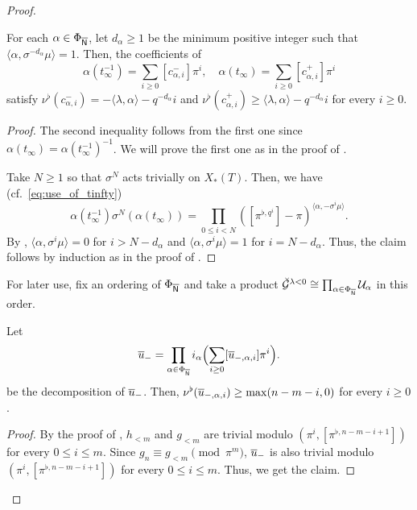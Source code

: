 \documentclass[12pt,reqno]{amsart}
\begin{document}
\begin{proof}
\begin{lem} \label{lem:valuation_on_calpha+-}
    For each $\alpha \in \Phi_{{\overline{{\mathsf{N}}}}}$, let $d_\alpha \geq 1$ be the minimum positive integer such that $\langle \alpha, \sigma^{-d_\alpha} \mu \rangle = 1$. Then, the coefficients of
    \[
        \alpha(t_\infty^{-1}) = \sum_{i \geq 0} [c_{\alpha, i}^{-}] \pi^i, \quad
        \alpha(t_\infty) = \sum_{i \geq 0} [c_{\alpha, i}^{+}] \pi^i
    \]
    satisfy $\nu^\flat(c_{\alpha, i}^{-}) = - \langle \lambda, \alpha \rangle - q^{-d_\alpha} i$ and $\nu^\flat(c_{\alpha, i}^{+}) \geq \langle \lambda, \alpha \rangle - q^{-d_\alpha} i$ for every $i \geq 0$. 
\end{lem}
\begin{proof}
    The second inequality follows from the first one since $\alpha(t_\infty) = \alpha(t_\infty^{-1})^{-1}$. We will prove the first one as in the proof of . 

    Take $N \geq 1$ so that $\sigma^N$ acts trivially on $X_*(T)$. Then, we have (cf.\ \eqref{eq:use_of_tinfty})
    \[
        \alpha(t_\infty^{-1}) \sigma^N(\alpha(t_\infty)) = \prod_{0 \leq i < N} ([\pi^{\flat, q^i}]-\pi)^{\langle \alpha, - \sigma^i \mu \rangle}. 
    \]
    By \cite[Lemma 3.2]{Tak25z}, $\langle \alpha, \sigma^i \mu \rangle = 0$ for $i > N - d_\alpha$ and $\langle \alpha, \sigma^i \mu \rangle = 1$ for $i = N - d_\alpha$. Thus, the claim follows by induction as in the proof of . 
\end{proof}

For later use, fix an ordering of $\Phi_{{\mathsf{{\overline{N}}}}}$ and take a product ${\mathcal{\breve{G}}}^{\lambda < 0} \cong \prod_{\alpha \in \Phi_{{\overline{{\mathsf{N}}}}}} {\mathcal{U}}_\alpha$ in this order. 

\begin{lem} \label{lem:valuation_on_n-<m}
    Let
    \[
        {\overline{u}}_- = \prod_{\alpha \in \Phi_{{\overline{{\mathsf{N}}}}}} i_{\alpha}\Bigl(\sum_{i \geq 0} [{\overline{u}}_{-, \alpha, i}]\pi^i \Bigr). 
    \]
    be the decomposition of ${\overline{u}}_-$. Then, $\nu^\flat({\overline{u}}_{-, \alpha, i}) \geq \max(n - m - i, 0)$ for every $i \geq 0$. 
\end{lem}
\begin{proof}
    By the proof of , $h_{<m}$ and $g_{<m}$ are trivial modulo $(\pi^i, [\pi^{\flat, n - m - i + 1}])$ for every $0 \leq i \leq m$. Since $g_n \equiv g_{<m} \pmod{\pi^m}$, ${\overline{u}}_-$ is also trivial modulo $(\pi^i, [\pi^{\flat, n - m - i + 1}])$ for every $0 \leq i \leq m$. Thus, we get the claim. 
\end{proof} 


\end{proof}
\end{document}
